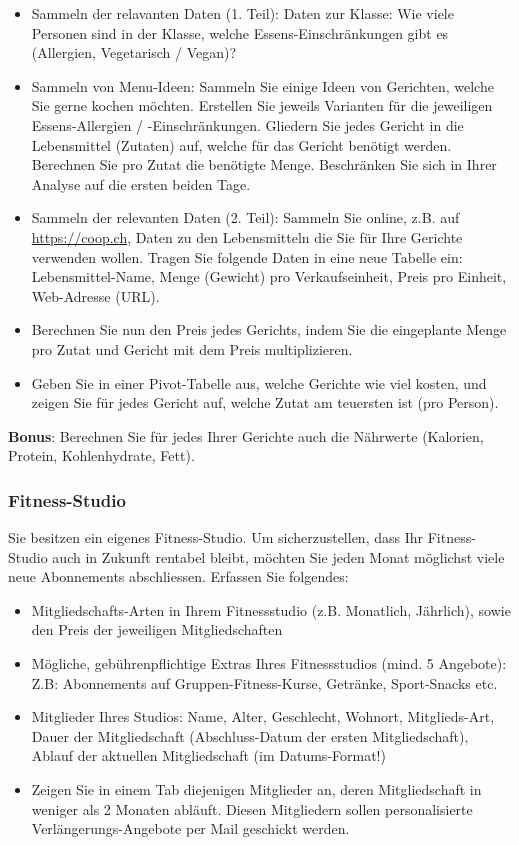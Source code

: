 \begin{itemize}
	\item Sammeln der relavanten Daten (1. Teil): Daten zur Klasse: Wie viele Personen sind in der Klasse, welche Essens-Einschränkungen gibt es (Allergien, Vegetarisch / Vegan)?
	\item Sammeln von Menu-Ideen: Sammeln Sie einige Ideen von Gerichten, welche Sie gerne kochen möchten. Erstellen Sie jeweils Varianten für die jeweiligen Essens-Allergien / -Einschränkungen. Gliedern Sie jedes Gericht in die Lebensmittel (Zutaten) auf, welche für das Gericht benötigt werden. Berechnen Sie pro Zutat die benötigte Menge. Beschränken Sie sich in Ihrer Analyse auf die ersten beiden Tage. 
	\item Sammeln der relevanten Daten (2. Teil): Sammeln Sie online, z.B. auf \url{https://coop.ch}, Daten zu den Lebensmitteln die Sie für Ihre Gerichte verwenden wollen. Tragen Sie folgende Daten in eine neue Tabelle ein: Lebensmittel-Name, Menge (Gewicht) pro Verkaufseinheit, Preis pro Einheit, Web-Adresse (URL).
	\item Berechnen Sie nun den Preis jedes Gerichts, indem Sie die eingeplante Menge pro Zutat und Gericht mit dem Preis multiplizieren. 
	\item Geben Sie in einer Pivot-Tabelle aus, welche Gerichte wie viel kosten, und zeigen Sie für jedes Gericht auf, welche Zutat am teuersten ist (pro Person).
\end{itemize}
\textbf{Bonus}: Berechnen Sie für jedes Ihrer Gerichte auch die Nährwerte (Kalorien, Protein, Kohlenhydrate, Fett).

\subsubsection*{Fitness-Studio}
Sie besitzen ein eigenes Fitness-Studio. Um sicherzustellen, dass Ihr Fitness-Studio auch in Zukunft rentabel bleibt, möchten Sie jeden Monat möglichst viele neue Abonnements abschliessen. Erfassen Sie folgendes:

\begin{itemize}
	\item Mitgliedschafts-Arten in Ihrem Fitnessstudio (z.B. Monatlich, Jährlich), sowie den Preis der jeweiligen Mitgliedschaften
	\item Mögliche, gebührenpflichtige Extras Ihres Fitnessstudios (mind. 5 Angebote): Z.B: Abonnements auf Gruppen-Fitness-Kurse, Getränke, Sport-Snacks etc.	
	\item Mitglieder Ihres Studios: Name, Alter, Geschlecht, Wohnort, Mitglieds-Art, Dauer der Mitgliedschaft (Abschluss-Datum der ersten Mitgliedschaft), Ablauf der aktuellen Mitgliedschaft (im Datums-Format!)
	\item Zeigen Sie in einem Tab diejenigen Mitglieder an, deren Mitgliedschaft in weniger als 2 Monaten abläuft. Diesen Mitgliedern sollen personalisierte Verlängerungs-Angebote per Mail geschickt werden.
\end{itemize}

